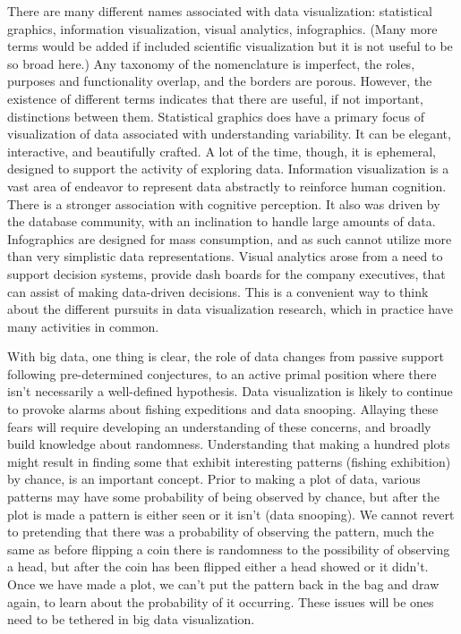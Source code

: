 \documentclass{article}
\begin{document}
There are many different names associated with data visualization: statistical graphics, information visualization, visual analytics, infographics. (Many more terms would be added if included scientific visualization but it is not useful to be so broad here.) Any taxonomy of the nomenclature is imperfect, the roles, purposes and functionality overlap, and the borders are porous. However, the existence of different terms indicates that there are useful, if not important, distinctions between them. Statistical graphics does have a primary focus of visualization of data associated with understanding variability. It can be elegant, interactive, and beautifully crafted. A lot of the time, though, it is ephemeral, designed to support the activity of exploring data.  Information visualization is a vast area of endeavor to represent data abstractly to reinforce human cognition. There is a stronger association with cognitive perception. It also was driven by the database community, with an inclination to handle large amounts of data.  Infographics are designed for mass consumption, and as such cannot utilize more than very simplistic data representations.  Visual analytics arose from a need to support decision systems, provide dash boards for the company executives, that can assist of making data-driven decisions. This is a convenient way to think about the different pursuits in data visualization research, which in practice have many activities in common.

With big data, one thing is clear, the role of data changes from passive support following pre-determined conjectures, to an active primal position where there isn't necessarily a well-defined hypothesis. Data visualization is likely to continue to provoke alarms about fishing expeditions and data snooping. Allaying these fears will require developing an understanding of these concerns, and broadly build knowledge about randomness. Understanding that making a hundred plots might result in finding some that exhibit interesting patterns (fishing exhibition) by chance, is an important concept. Prior to making a plot of data, various patterns may have some probability of being observed by chance, but after the plot is made a pattern is either seen or it isn't (data snooping).  We cannot revert to pretending that there was a probability of observing the pattern, much the same as before flipping a coin there is randomness to the possibility of observing a head, but after the coin has been flipped either a head showed or it didn't. Once we have made a plot, we can't put the pattern back in the bag and draw again, to learn about the probability of it occurring. These issues will be ones need to be tethered in big data visualization.




\end{document}
